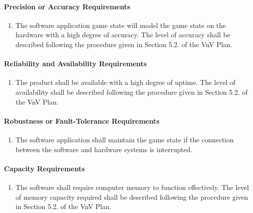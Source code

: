 \documentclass[12pt]{article}
\begin{document}
\paragraph{Precision or Accuracy Requirements}
\begin{enumerate}[{PR}1., leftmargin=2\parindent, resume]
    \item The software application game state will model the game state on the \progname{} hardware with a high degree of accuracy. 
    The level of accuracy shall be described following the procedure given in Section 5.2.\thevnvSectionNfr{}
    of the VnV Plan.
        
\end{enumerate}

\paragraph{Reliability and Availability Requirements}
\begin{enumerate}[{PR}1., leftmargin=2\parindent, resume]
    \item The product shall be available with a high degree of uptime. The level of availability shall be described following the procedure 
    given in Section 5.2.\thevnvSectionNfr{} of the VnV Plan.
\end{enumerate}

\paragraph{Robustness or Fault-Tolerance Requirements}
\begin{enumerate}[{PR}1., leftmargin=2\parindent, resume]
    \item The software application shall maintain the game state if the connection between the software and hardware systems is interrupted.
\end{enumerate}

\paragraph{Capacity Requirements}
\begin{enumerate}[{PR}1., leftmargin=2\parindent, resume]
    \item The software shall require computer memory to function effectively. The level of memory capacity required shall be described following
    the procedure given in Section 5.2.\thevnvSectionNfr{} of the VnV Plan.
\end{enumerate}
\end{document}
